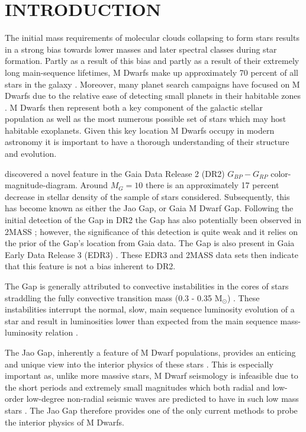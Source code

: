 \section{INTRODUCTION}\label{sec:intro}
The initial mass requirements of molecular clouds collapsing to form stars
results in a strong bias towards lower masses and later spectral classes
during star formation. Partly as a result of this bias and partly as a result
of their extremely long main-sequence lifetimes, M Dwarfs make up approximately
70 percent of all stars in the galaxy \citep{Winters2019}. Moreover, many
planet search campaigns have focused on M Dwarfs due to the relative ease of
detecting small planets in their habitable zones \citep[e.g.][]{Nut08}. M
Dwarfs then represent both a key component of the galactic stellar population
as well as the most numerous possible set of stars which may host habitable
exoplanets. Given this key location M Dwarfs occupy in modern astronomy it is
important to have a thorough understanding of their structure and evolution.

\citet{Jao2018} discovered a novel feature in the Gaia Data Release 2 (DR2)
$G_{BP}-G_{RP}$ color-magnitude-diagram. Around $M_{G}=10$ there is an
approximately 17 percent decrease in stellar density of the sample of stars
\citet{Jao2018} considered. Subsequently, this has become known as either the
Jao Gap, or Gaia M Dwarf Gap. Following the initial detection of the Gap in DR2
the Gap has also potentially been observed in 2MASS \citep{Skrutskie2006,
Jao2018}; however, the significance of this detection is quite weak and it
relies on the prior of the Gap's location from Gaia data. The Gap is
also present in Gaia Early Data Release 3 (EDR3) \citep{Jao2021}. These EDR3
and 2MASS data sets then indicate that this feature is not a bias inherent to
DR2.

The Gap is generally attributed to convective instabilities in the cores of
stars straddling the fully convective transition mass (0.3 - 0.35 M$_{\odot}$)
\citep{Baraffe2018}. These instabilities interrupt the normal, slow, main
sequence luminosity evolution of a star and result in luminosities lower
than expected from the main sequence mass-luminosity relation \citep{Jao2020}.

The Jao Gap, inherently a feature of M Dwarf populations, provides an enticing
and unique view into the interior physics of these stars \citep{Feiden2021}.
This is especially important as, unlike more massive stars, M Dwarf seismology
is infeasible due to the short periods and extremely small
magnitudes which both radial and low-order low-degree non-radial seismic waves
are predicted to have in such low mass stars \citep{Rodriguez-Lopez2019}. The
Jao Gap therefore provides one of the only current methods to probe the
interior physics of M Dwarfs.

